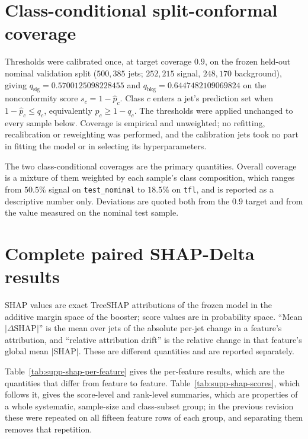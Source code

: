 \documentclass[11pt,a4paper,onecolumn]{article}
\begin{document}
\section{Class-conditional split-conformal coverage}

Thresholds were calibrated once, at target coverage $0.9$, on the frozen held-out
nominal validation split ($500{,}385$ jets; $252{,}215$ signal, $248{,}170$
background), giving $q_{\mathrm{sig}} = 0.5700125098228455$ and
$q_{\mathrm{bkg}} = 0.6447482109069824$ on the nonconformity score
$s_c = 1 - \hat p_c$. Class $c$ enters a jet's prediction set when
$1 - \hat p_c \le q_c$, equivalently $\hat p_c \ge 1 - q_c$. The thresholds were
applied unchanged to every sample below. Coverage is empirical and unweighted; no
refitting, recalibration or reweighting was performed, and the calibration jets
took no part in fitting the model or in selecting its hyperparameters.

The two class-conditional coverages are the primary quantities. Overall coverage
is a mixture of them weighted by each sample's class composition, which ranges
from $50.5\%$ signal on \texttt{test\_nominal} to $18.5\%$ on \texttt{tfl}, and is
reported as a descriptive number only. Deviations are quoted both from the $0.9$
target and from the value measured on the nominal test sample.





\section{Complete paired SHAP-Delta results}

SHAP values are exact TreeSHAP attributions of the frozen model in the additive
margin space of the booster; score values are in probability space.
``Mean $|\Delta$SHAP$|$'' is the mean over jets of the absolute per-jet change in
a feature's attribution, and ``relative attribution drift'' is the relative change
in that feature's global mean $|$SHAP$|$. These are different quantities and are
reported separately.

Table~\ref{tab:supp-shap-per-feature} gives the per-feature results, which are the
quantities that differ from feature to feature. Table~\ref{tab:supp-shap-scores},
which follows it, gives the score-level and rank-level summaries, which are properties of a whole
systematic, sample-size and class-subset group; in the previous revision these
were repeated on all fifteen feature rows of each group, and separating them
removes that repetition.
\end{document}
